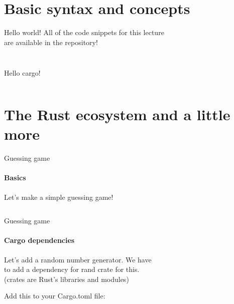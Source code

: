 \documentclass[usenames,dvipsnames,10pt,aspectratio=169]{beamer}
\begin{document}

\section{Basic syntax and concepts}

\begin{frame}{Hello world!}
	\large
	\textcolor{ucuyellow}{
	All of the code snippets for this lecture\\
	are available in the repository!}
	\vspace{0.5cm}
	\inputminted[fontsize=\Large]{c}{code/helloworld.rs}
	\vspace{0.4cm}
	\inputminted[fontsize=\Large]{bash}{code/helloworld.sh}

\end{frame}

\begin{frame}{Hello cargo!}

	\inputminted[fontsize=\Large]{bash}{code/hellocargo.sh}

\end{frame}


\section{The Rust ecosystem and a little more}

\begin{frame}{Guessing game}
	\framesubtitle{Basics}
\textcolor{ucuyellow}{Let's make a simple guessing game!}
	\vspace{0.4cm}
	\inputminted[fontsize=\normalsize]{c}{code/guess1.rs}
	\vspace{0.4cm}
\end{frame}

\begin{frame}{Guessing game}
	\framesubtitle{Cargo dependencies}
	\Large
	Let's add a random number generator. We have\\
	to add a dependency for \textcolor{ucuyellow}{rand} crate for this.\\
	(crates are Rust's libraries and modules)
	\vspace{0.5cm}

	Add this to your Cargo.toml file:
	\inputminted[fontsize=\Large]{c}{code/toml1.toml}
\end{frame}
\end{document}

